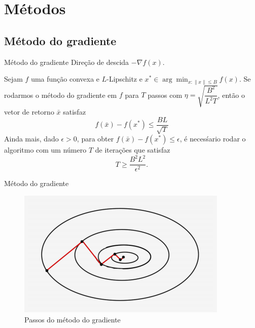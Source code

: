 \documentclass{beamer}
\newcommand{\norm}[1]{\left\lVert#1\right\rVert}
\begin{document}
\section{Métodos}
    \subsection{Método do gradiente}
        \begin{frame}{Método do gradiente}
            Direção de descida $-\nabla f(x)$.
            
            \begin{theorem}
                Sejam $f$ uma função convexa e $L$-Lipschitz e $x^{*} \in \arg\min_{x: \norm{x} \leq B} f(x)$. Se rodarmos o método do gradiente em $f$ para $T$ passos com $\eta = \sqrt{\dfrac{B^2}{L^2T}}$, então o vetor de retorno $\bar{x}$ satisfaz 
                \begin{equation*}
                    f(\bar{x}) - f(x^{*}) \leq \frac{BL}{\sqrt{T}}
                \end{equation*}
                Ainda mais, dado $\epsilon > 0$, para obter $f(\bar{x}) - f(x^{*}) \leq \epsilon$, é necesśario rodar o algoritmo com um número $T$ de iterações que satisfaz
                \begin{equation*}
                    T \geq \frac{B^2L^2}{\epsilon^2}.
                \end{equation*}
            \end{theorem}
        \end{frame}

        \begin{frame}{Método do gradiente}
            \begin{figure}
                \centering
                \includegraphics[width=.80\textwidth]{gradiente.png}
                \caption{Passos do método do gradiente}
                \label{fig:gc}
            \end{figure}
        \end{frame}
\end{document}
